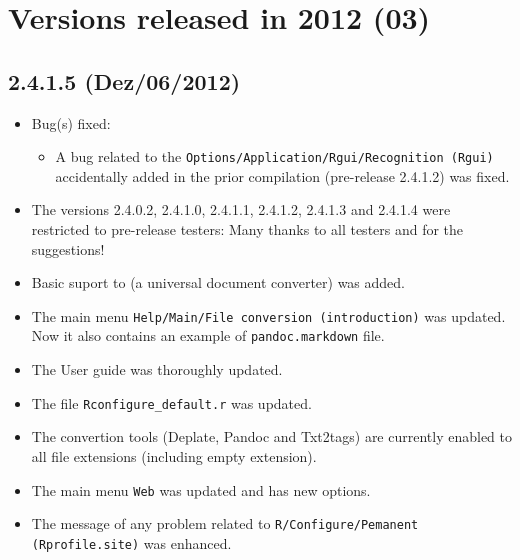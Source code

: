 
\hypertarget{2012}{}
\section{Versions released in 2012 (03)}
\subsection*{2.4.1.5 (Dez/06/2012)}
\begin{itemize}
  \item Bug(s) fixed:
    \begin{itemize}
      \item A bug related to the \texttt{Options/Application/Rgui/Recognition (Rgui)} accidentally added
        in the prior compilation (pre-release 2.4.1.2) was fixed.
    \end{itemize}
  \item The versions 2.4.0.2, 2.4.1.0, 2.4.1.1, 2.4.1.2, 2.4.1.3 and 2.4.1.4 were restricted to pre-release testers:
    Many thanks to all testers and for the suggestions!
  \item Basic suport to  (a universal document converter) was added.
  \item The main menu \texttt{Help/Main/File conversion (introduction)} was updated. Now it also contains an example of \texttt{pandoc.markdown} file.
  \item The User guide was thoroughly updated.
  \item The file \texttt{Rconfigure\_default.r} was updated.
  \item The convertion tools (Deplate, Pandoc and Txt2tags) are currently enabled to all file extensions (including empty extension).
  \item The main menu \texttt{Web} was updated and has new options.
  \item The message of any problem related to \texttt{R/Configure/Pemanent (Rprofile.site)} was enhanced.
\end{itemize}


